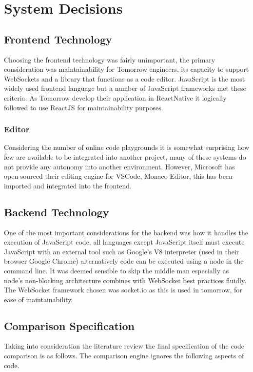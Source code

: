 \documentclass[jou,apacite]{apa6}
\begin{document}
\section{System Decisions}
\subsection{Frontend Technology}
Choosing the frontend technology was fairly unimportant, the primary consideration was maintainability for Tomorrow engineers, its capacity to support WebSockets and a library that functions as a code editor. JavaScript is the most widely used frontend language but a number of JavaScript frameworks met these criteria. As Tomorrow develop their application in ReactNative it logically followed to use ReactJS for maintainability purposes. 
\subsubsection{Editor}
Considering the number of online code playgrounds it is somewhat surprising how few are available to be integrated into another project, many of these systems do not provide any autonomy into another environment. However, Microsoft has open-sourced their editing engine for VSCode, Monaco Editor, this has been imported and integrated into the frontend. 
\subsection{Backend Technology}
One of the most important considerations for the backend was how it handles the execution of JavaScript code, all languages except JavaScript itself must execute JavaScript with an external tool such as Google’s V8 interpreter (used in their browser Google Chrome) alternatively code can be executed using a node in the command line. It was deemed sensible to skip the middle man especially as node's non-blocking architecture combines with WebSocket best practices fluidly. The WebSocket framework chosen was socket.io as this is used in tomorrow, for ease of maintainability.
\subsection{Comparison Specification}
Taking into consideration the literature review the final specification of the code comparison is as follows. The comparison engine ignores the following aspects of code.
\end{document}
